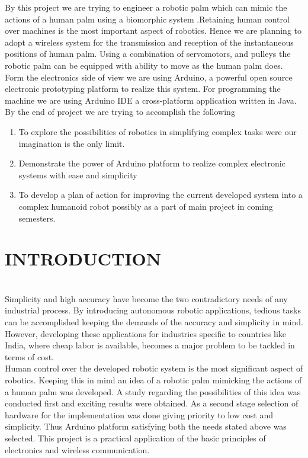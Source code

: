 \documentclass[a4paper, 12pt, notitlepage]{report}
\begin{document}
 			By this project we are trying to engineer a robotic palm which can mimic the actions of a human palm using a biomorphic system .Retaining human control over machines is the most important aspect of robotics. Hence we are planning to adopt a wireless system for the transmission and reception of the instantaneous positions of human palm. Using a combination of servomotors, and pulleys the robotic palm can be equipped with ability to move as the human palm does.\\
			
Form the electronics side of view we are using Arduino, a powerful open source electronic prototyping platform to realize this system. For programming the machine we are using Arduino IDE a cross-platform application written in Java.
By the end of project we are trying to accomplish the following \\

\begin{enumerate}
\item To explore the possibilities of robotics in simplifying complex tasks were our imagination is the only limit.
\item Demonstrate the power of Arduino platform to realize complex    electronic systems with ease and simplicity
\item To develop a plan of action for improving the current developed system   into a complex humanoid robot possibly as a part of main project in coming semesters.
 \end{enumerate}

\tableofcontents
\listoffigures 


\chapter{INTRODUCTION}
\\

Simplicity and high accuracy have become the two contradictory needs of any industrial process. By introducing autonomous robotic applications, tedious tasks can be accomplished keeping the demands of the accuracy and simplicity in mind. However, developing these applications for industries speciﬁc to countries like India, where cheap labor is available, becomes a major problem to be tackled in terms of cost.\\

Human control over the developed robotic system is the most significant aspect of robotics. Keeping this in mind an idea of a robotic palm mimicking the actions of a human palm was developed.  A study regarding the possibilities of this idea was conducted first and exciting results were obtained. As a second stage selection of hardware for the implementation was done giving priority to low cost and simplicity. Thus Arduino platform satisfying both the needs stated above was selected. This project is a practical application of the basic principles of electronics and wireless communication.\\
\end{document}
